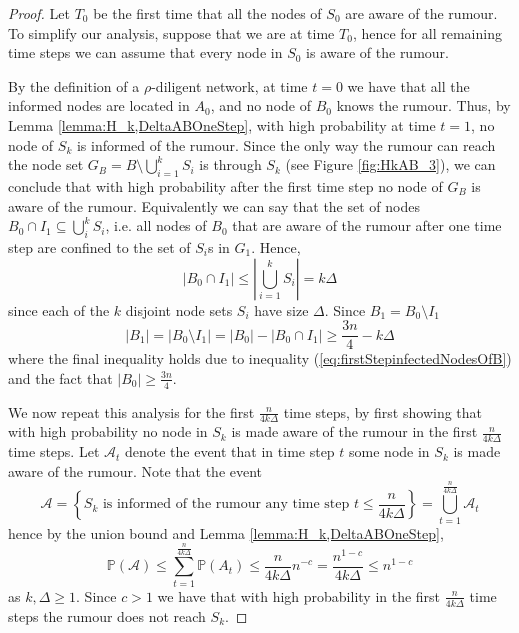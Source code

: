 
\begin{proof} 
	Let $T_0$ be the first time that all the nodes of $S_0$ are aware of the rumour. To simplify our analysis, suppose that we are at time $T_0$, hence for all remaining time steps we can assume that every node in $S_0$ is aware of the rumour. %

	By the definition of a $\rho$-diligent network, at time $t=0$  we have that all the informed nodes are located in $A_0$, and no node of $B_0$ knows the rumour. Thus, by Lemma \ref{lemma:H_k,DeltaABOneStep}, with high probability at time $t = 1$, no node of $S_k$ is informed of the rumour. Since the only way the rumour can reach the node set $G_B = B \setminus \bigcup_{i=1}^k S_i$ is through $S_k$ (see Figure \ref{fig:HkAB_3}), we can conclude that with high probability after the first time step no node of $G_B$ is aware of the rumour. Equivalently we can say that the set of nodes $B_0 \cap I_1 \subseteq \bigcup_i^k S_i$, i.e. all nodes of $B_0$ that are aware of the rumour after one time step are confined to the set of $S_i$s in $G_1$. Hence, 
	\begin{equation}\label{eq:firstStepinfectedNodesOfB}
		|B_0 \cap I_1| \leq \left|\bigcup_{i=1}^k S_i\right| = k\Delta
	\end{equation}
	since each of the $k$ disjoint node sets $S_i$ have size $\Delta$. Since $B_1 = B_0 \setminus I_1$
	$$
		|B_1| = |B_0 \setminus I_1| = |B_0| - |B_0 \cap I_1| \geq \frac{3n}{4} - k\Delta
	$$ %
	where the final inequality holds due to inequality (\ref{eq:firstStepinfectedNodesOfB}) and the fact that $|B_0| \geq \frac{3n}{4}$. 

	We now repeat this analysis for the first $\frac{n}{4k\Delta}$ time steps, by first showing that with high probability no node in $S_k$ is made aware of the rumour in the first $\frac{n}{4k\Delta}$ time steps. Let $\mathcal{A}_t$ denote the event that in time step $t$ some node in $S_k$ is made aware of the rumour. Note that the event 
	$$\mathcal{A} = \left\{S_k \text{ is informed of the rumour any time step } t \leq \frac{n}{4k\Delta} \right\} = \bigcup_{t=1}^\frac{n}{4k\Delta} \mathcal{A}_t
	$$
	hence by the union bound and Lemma \ref{lemma:H_k,DeltaABOneStep},
	$$
		\mathbb{P}(\mathcal{A}) 
		\leq \sum_{t=1}^\frac{n}{4k\Delta} \mathbb{P}(A_t) 
		\leq \frac{n}{4k\Delta}n^{-c}
		= \frac{n^{1-c}}{4k\Delta} \leq n^{1-c}
	$$
	as $k, \Delta \geq 1$. Since $c > 1$ %
	we have that with high probability in the first $\frac{n}{4k\Delta}$ time steps the rumour does not reach $S_k$. 


\end{proof}
